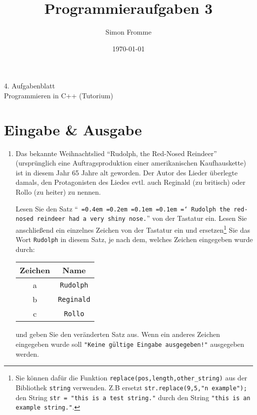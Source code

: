 \documentclass[paper=a4, fontsize=11pt, twoside]{scrartcl}
\title{Programmieraufgaben 3}
\author{Simon Fromme}
\date{\normalsize\today}
\newcommand*\justify{%
  \fontdimen2\font=0.4em%
  \fontdimen3\font=0.2em%
  \fontdimen4\font=0.1em%
  \fontdimen7\font=0.1em%
  \hyphenchar\font=`\-%
}
\begin{document}
\vspace*{0.75\baselineskip}
\begin{center}
  \Large 4. Aufgabenblatt \\\vspace{0.5em} \large Programmieren in C++ (Tutorium)
\end{center}

\section*{Eingabe \& Ausgabe}
\begin{enumerate}
\item Das bekannte Weihnachtslied ``Rudolph, the Red-Nosed Reindeer'' (ursprünglich eine Auftragsproduktion einer amerikanischen Kaufhauskette) ist in diesem Jahr 65 Jahre alt geworden. Der Autor des Lieder überlegte damals, den Protagonisten des Liedes evtl. auch Reginald (zu britisch) oder Rollo (zu heiter) zu nennen. \par
Lesen Sie den Satz ``\texttt{\justify Rudolph the red-nosed reindeer had a very shiny nose.}'' von der Tastatur ein. Lesen Sie anschließend ein einzelnes Zeichen von der Tastatur ein und ersetzen\footnote{Sie können dafür die Funktion \texttt{replace(pos,length,other_string)} aus der Bibliothek \texttt{string} verwenden. Z.B ersetzt \texttt{str.replace(9,5,"n example");} den String \texttt{str = "this is a test string."} durch den String \texttt{"this is an example string."}.  } Sie das Wort \texttt{Rudolph} in diesem Satz, je nach dem, welches Zeichen eingegeben wurde durch:
\begin{table}[h!]
   \centering
   \begin{tabular}{cc}
    Zeichen & Name \\
\hline
    a & \texttt{Rudolph} \\
    b & \texttt{Reginald} \\
    c & \texttt{Rollo} \\
   \end{tabular}
\end{table}

und geben Sie den veränderten Satz aus. Wenn ein anderes Zeichen eingegeben wurde soll \texttt{"Keine gültige Eingabe ausgegeben!"} ausgegeben werden. 
\end{enumerate}

\end{document}
